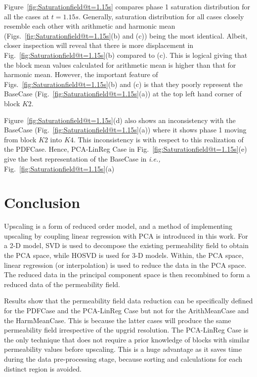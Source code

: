 \documentclass[preprint,12pt]{elsarticle}
\newcommand{\ie}{{\it i.e., }}
\begin{document}
Figure~\ref{fig:Saturationfield@t=1.15s} compares phase 1 saturation distribution for all the cases at $t=1.15s$. Generally, saturation distribution for all cases closely resemble each other with arithmetic and harmonic mean (Figs.~\ref{fig:Saturationfield@t=1.15s}(b) and (c)) being the most identical. Albeit, closer inspection will reveal that there is more displacement in Fig.~\ref{fig:Saturationfield@t=1.15s}(b) compared to (c). This is logical giving that the block mean values calculated for arithmetic mean is higher than that for harmonic mean. However, the important feature of Figs.~\ref{fig:Saturationfield@t=1.15s}(b) and (c) is that they poorly represent the BaseCase (Fig.~\ref{fig:Saturationfield@t=1.15s}(a)) at the top left hand corner of block $K2$.

Figure~\ref{fig:Saturationfield@t=1.15s}(d) also shows an inconsistency with the BaseCase (Fig.~\ref{fig:Saturationfield@t=1.15s}(a)) where it shows phase 1 moving from block $K2$ into $K4$. This inconsistency is with respect to this realization of the PDFCase. Hence, PCA-LinReg Case in Fig.~\ref{fig:Saturationfield@t=1.15s}(e) give the best representation of the BaseCase in \ie Fig.~\ref{fig:Saturationfield@t=1.15s}(a)

\section{Conclusion}\label{section:conclusion}

Upscaling is a form of reduced order model, and a method of implementing upscaling by coupling linear regression with PCA is introduced in this work. For a 2-D model, SVD is used to decompose the existing permeability field to obtain the PCA space, while HOSVD is used for 3-D models. Within, the PCA space, linear regression (or interpolation) is used to reduce the data in the PCA space. The reduced data in the principal component space is then recombined to form a reduced data of the permeability field.

Results show that the permeability field data reduction can be specifically defined for the PDFCase and the PCA-LinReg Case but not for the ArithMeanCase and the HarmMeanCase. This is because the latter cases will produce the same permeability field irrespective of the upgrid resolution. The PCA-LinReg Case is the only technique that does not require a prior knowledge of blocks with similar permeability values before upscaling. This is a huge advantage as it saves time during the data pre-processing stage, because sorting and calculations for each distinct region is avoided. 
\end{document}
